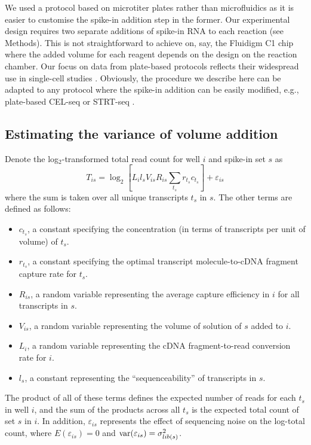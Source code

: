 \documentclass{article}
\begin{document}
We used a protocol based on microtiter plates rather than microfluidics as it is easier to customise the spike-in addition step in the former.
Our experimental design requires two separate additions of spike-in RNA to each reaction (see Methods).
This is not straightforward to achieve on, say, the Fluidigm C1 chip where the added volume for each reagent depends on the design on the reaction chamber.
Our focus on data from plate-based protocols reflects their widespread use in single-cell studies \cite{segerstople2016single,islam2011characterization,wilson2015combined}.
Obviously, the procedure we describe here can be adapted to any protocol where the spike-in addition can be easily modified, e.g., plate-based CEL-seq \cite{hashimshony2016celseq2} or STRT-seq \cite{islam2011characterization}.

\subsection{Estimating the variance of volume addition}
Denote the log$_2$-transformed total read count for well $i$ and spike-in set $s$ as
\[
T_{is} = \log_2 \left[ L_i l_s V_{is} R_{is} \sum_{t_s} r_{t_s} c_{t_s} \right] + \varepsilon_{is}
\]
where the sum is taken over all unique transcripts $t_s$ in $s$.
The other terms are defined as follows:
\begin{itemize}
    \item $c_{t_s}$, a constant specifying the concentration (in terms of transcripts per unit of volume) of $t_s$.
    \item $r_{t_s}$, a constant specifying the optimal transcript molecule-to-cDNA fragment capture rate for $t_s$.
    \item $R_{is}$, a random variable representing the average capture efficiency in $i$ for all transcripts in $s$.
    \item $V_{is}$, a random variable representing the volume of solution of $s$ added to $i$.
    \item $L_i$, a random variable representing the cDNA fragment-to-read conversion rate for $i$.
    \item $l_s$, a constant representing the ``sequenceability'' of transcripts in $s$.
\end{itemize}
The product of all of these terms defines the expected number of reads for each $t_s$ in well $i$, and the sum of the products across all $t_s$ is the expected total count of set $s$ in $i$.
In addition, $\varepsilon_{is}$ represents the effect of sequencing noise on the log-total count, where $E(\varepsilon_{is})=0$ and $\mbox{var}(\varepsilon_{is})= \sigma^2_{lib(s)}$.
\end{document}
